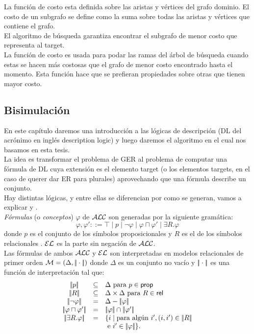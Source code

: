 La funci\'on de costo esta definida sobre las aristas y v\'ertices del grafo dominio. El costo de un subgrafo se define como la suma sobre todas las aristas y v\'ertices que contiene el grafo.\\
El algoritmo de b\'usqueda garantiza encontrar el subgrafo de menor costo que representa al target.\\

La funci\'on de costo es usada para podar las ramas del \'arbol de b\'usqueda cuando estas se hacen m\'as costosas que el grafo de menor costo encontrado hasta el momento. Esta funci\'on hace que se prefieran propiedades sobre otras que tienen mayor costo.

\subsection{Bisimulaci\'on}


En este cap\'itulo daremos una introducci\'on a las l\'ogicas de descripci\'on (DL del acr\'onimo en ingl\'es description logic) y luego daremos el algoritmo en el cual nos basamos en esta tesis.\\

La idea es transformar el problema de GER al problema de computar una f\'ormula de DL cuya extensi\'on es el elemento target (o los elementos targets, en el caso de querer dar ER para plurales) aprovechando que una f\'ormula describe un conjunto.\\

Hay distintas l\'ogicas, y entre ellas se diferencian por como se generan, vamos a explicar \alc y \el.\\

\emph{F\'ormulas} (o \emph{conceptos}) $\varphi$ de $\mathcal{ALC}$ son generadas por la siguiente gram\'atica:
$$
\varphi,\varphi' ::= \top \mid p \mid \neg \varphi \mid \varphi \sqcap \varphi'
\mid \exists R. \varphi
$$
donde $p$ es el conjunto de los s\'imbolos proposicionales \prop y $R$ es el de los s\'imbolos relacionales \rel. $\mathcal{EL}$ es la parte sin negaci\'on de $\mathcal{ALC}$.\\

Las f\'ormulas de ambos $\mathcal{ALC}$ y $\mathcal{EL}$ son interpretadas en modelos relacionales de primer orden $\mathcal{M} = (\Delta,|\!|\cdot|\!|)$ donde
$\Delta$ es un conjunto no vac\'io y $|\!|\cdot|\!|$ es una funci\'on de interpretaci\'on tal que:
$$
\begin{array}{ccl}
\interp{p} & \subseteq & \Delta  \mbox{ para $p \in \prop$}\\
\interp{R} & \subseteq & \Delta \times \Delta  \mbox{ para $R \in \rel$}\\
\interp{\neg \varphi} & = & \Delta - \interp{\varphi}\\
\interp{\varphi \sqcap \varphi'} & = & \interp{\varphi} \cap \interp{\varphi'}\\
\interp{\exists R.\varphi} & = & \{i \mid \mbox{para alg\'un } i', (i,i') \in \interp{R}\\
& & \mbox{ e } i' \in \interp{\varphi} \}.\\
\end{array}
$$

